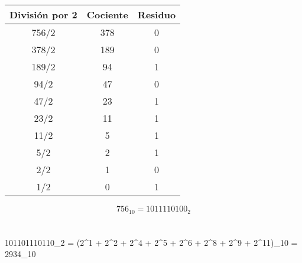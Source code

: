 \documentclass{article}
\begin{document}
\section{}
\begin{center}
    \begin{tabular}{ |c|c|c| }
        \hline
        División por 2 & Cociente & Residuo \\
        \hline
        756/2 & 378 & 0 \\
        378/2 & 189 & 0 \\
        189/2 & 94 & 1 \\
        94/2 & 47 & 0 \\
        47/2 & 23 & 1 \\
        23/2 & 11 & 1 \\
        11/2 & 5 & 1 \\
        5/2 & 2 & 1 \\
        2/2 & 1 & 0 \\
        1/2 & 0 & 1 \\
        \hline
    \end{tabular}
\end{center}
\[
    756_{10} = 1011110100_2
\]
\section{}

101101110110_2 = (2^1 + 2^2 + 2^4 + 2^5 + 2^6 + 2^8 + 2^9 + 2^{11})_{10} = 2934_{10}
\end{document}
